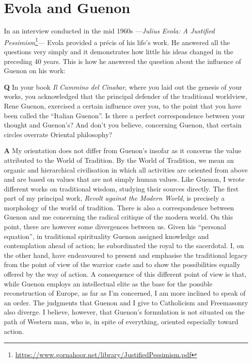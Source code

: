 \section{Evola and Guenon}

In an interview conducted in the mid 1960s ---\textit{Julius Evola: A Justified Pessimism}\footnote{\url{https://www.gornahoor.net/library/JustifiedPessimism.pdf}}--- Evola provided a précis of his life's work. He answered all the questions very simply and it demonstrates how little his ideas changed in the preceding 40 years. This is how he answered the question about the influence of Guenon on his work:

\textbf{Q} In your book \emph{Il Cammino del Cinabar}, where you laid out the genesis of your works, you acknowledged that the principal defender of the traditional worldview, Rene Guenon, exercised a certain influence over you, to the point that you have been called the ``Italian Guenon''. Is there a perfect correspondence between your thought and Guenon's? And don't you believe, concerning Guenon, that certain circles overrate Oriental philosophy?

\textbf{A} My orientation does not differ from Guenon's insofar as it concerns the value attributed to the World of Tradition. By the World of Tradition, we mean an organic and hierarchical civilisation in which all activities are oriented from above and are based on values that are not simply human values. Like Guenon, I wrote different works on traditional wisdom, studying their sources directly. The first part of my principal work, \emph{Revolt against the Modern World}, is precisely a morphology of the world of tradition. There is also a correspondence between Guenon and me concerning the radical critique of the modern world. On this point, there are however some divergences between us. Given his ``personal equation'', in traditional spirituality Guenon assigned knowledge and contemplation ahead of action; he subordinated the royal to the sacerdotal. I, on the other hand, have endeavoured to present and emphasise the traditional legacy from the point of view of the warrior caste and to show the possibilities equally offered by the way of action. A consequence of this different point of view is that, while Guenon employs an intellectual elite as the base for the possible reconstruction of Europe, as far as I'm concerned, I am more inclined to speak of an order. The judgments that Guenon and I give to Catholicism and Freemasonry also diverge. I believe, however, that Guenon's formulation is not situated on the path of Western man, who is, in spite of everything, oriented especially toward action.

